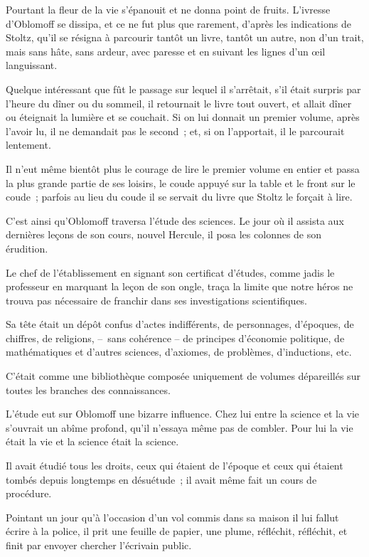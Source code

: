 \documentclass[french,twoside]{book} %
\begin{document}
Pourtant la fleur de la vie s’épanouit et ne donna point de fruits. L’ivresse d’Oblomoff se dissipa, et ce ne fut plus que rarement, d’après les indications de Stoltz, qu’il se résigna à parcourir tantôt un livre, tantôt un autre, non d’un trait, mais sans hâte, sans ardeur, avec paresse et en suivant les lignes d’un œil languissant.\par
Quelque intéressant que fût le passage sur lequel il s’arrêtait, s’il était surpris par l’heure du dîner ou du sommeil, il retournait le livre tout ouvert, et allait dîner ou éteignait la lumière et se couchait. Si on lui donnait un premier volume, après l’avoir lu, il ne demandait pas le second ; et, si on l’apportait, il le parcourait lentement.\par
Il n’eut même bientôt plus le courage de lire le premier volume en entier et passa la plus grande partie de ses loisirs, le coude appuyé sur la table et le front sur le coude ; parfois au lieu du coude il se servait du livre que Stoltz le forçait à lire.\par
C’est ainsi qu’Oblomoff traversa l’étude des sciences. Le jour où il assista aux dernières leçons de son cours, nouvel Hercule, il posa les colonnes de son érudition.\par
Le chef de l’établissement en signant son certificat d’études, comme jadis le professeur en marquant la leçon de son ongle, traça la limite que notre héros ne trouva pas nécessaire de franchir dans ses investigations scientifiques.\par
Sa tête était un dépôt confus d’actes indifférents, de personnages, d’époques, de chiffres, de religions, – sans cohérence – de principes d’économie politique, de mathématiques et d’autres sciences, d’axiomes, de problèmes, d’inductions, etc.\par
C’était comme une bibliothèque composée uniquement de volumes dépareillés sur toutes les branches des connaissances.\par
L’étude eut sur Oblomoff une bizarre influence. Chez lui entre la science et la vie s’ouvrait un abîme profond, qu’il n’essaya même pas de combler. Pour lui la vie était la vie et la science était la science.\par
Il avait étudié tous les droits, ceux qui étaient de l’époque et ceux qui étaient tombés depuis longtemps en désuétude ; il avait même fait un cours de procédure.\par
Pointant un jour qu’à l’occasion d’un vol commis dans sa maison il lui fallut écrire à la police, il prit une feuille de papier, une plume, réfléchit, réfléchit, et finit par envoyer chercher l’écrivain public.\par
\end{document}
